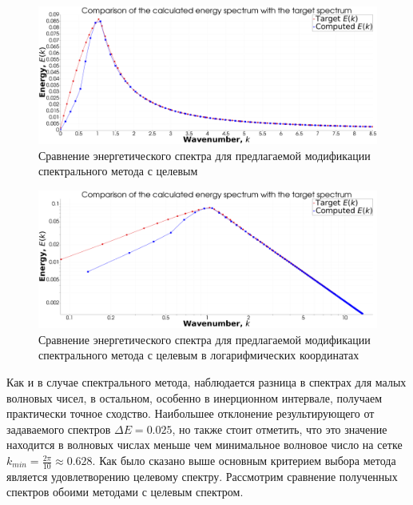 \begin{figure}[ht] 
    \center
    \includegraphics [width=0.8\linewidth] {images/kriging/spectrum.png}
    \caption{Сравнение энергетического спектра для предлагаемой модификации спектрального метода с целевым} 
    \label{img:kriging_result_field_no_angle}  
\end{figure}

\begin{figure}[ht] 
    \center
    \includegraphics [width=0.8\linewidth] {images/kriging/spectrum_loglog.png}
    \caption{Сравнение энергетического спектра для предлагаемой модификации спектрального метода с целевым в логарифмических координатах} 
    \label{img:kriging_result_field_on_angle}  
\end{figure}

Как и в случае спектрального метода, наблюдается разница в спектрах для малых волновых чисел, в остальном, особенно в инерционном интервале, получаем практически точное сходство. Наибольшее отклонение результирующего от задаваемого спектров $\Delta E = 0.025$, но также стоит отметить, что это значение находится в волновых числах меньше чем минимальное волновое число на сетке $k_{min}=\frac{2 \pi}{10} \approx 0.628$. Как было сказано выше основным критерием выбора метода является удовлетворению целевому спектру. Рассмотрим сравнение полученных спектров обоими методами с целевым спектром.

